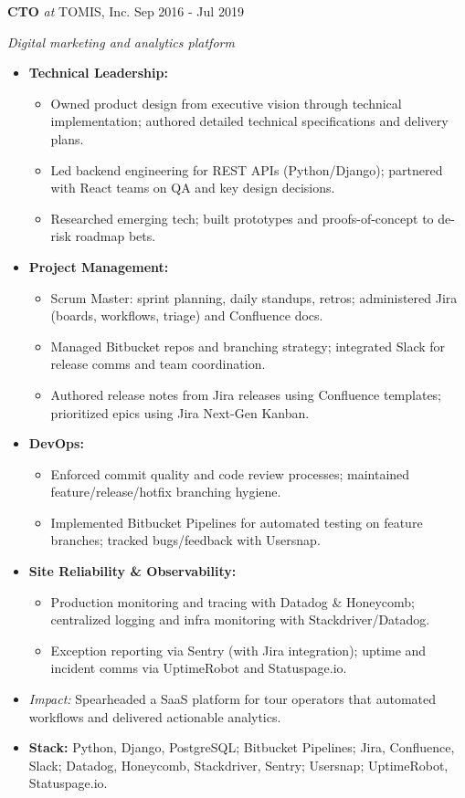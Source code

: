 \documentclass[10pt]{article}
\newcommand{\roleline}[4]{%
  \noindent\textbf{#1} \textit{at} #2 #3 \hfill #4\par
}
\begin{document}
\roleline{CTO}{TOMIS, Inc.}{}{Sep 2016 - Jul 2019}
\emph{Digital marketing and analytics platform}\par
\begin{itemize}
  \item \textbf{Technical Leadership:}
    \begin{itemize}[leftmargin=*,label=--]
      \item Owned product design from executive vision through technical implementation; authored detailed technical specifications and delivery plans.
      \item Led backend engineering for REST APIs (Python/Django); partnered with React teams on QA and key design decisions.
      \item Researched emerging tech; built prototypes and proofs-of-concept to de-risk roadmap bets.
    \end{itemize}
  \item \textbf{Project Management:}
    \begin{itemize}[leftmargin=*,label=--]
      \item Scrum Master: sprint planning, daily standups, retros; administered Jira (boards, workflows, triage) and Confluence docs.
      \item Managed Bitbucket repos and branching strategy; integrated Slack for release comms and team coordination.
      \item Authored release notes from Jira releases using Confluence templates; prioritized epics using Jira Next-Gen Kanban.
    \end{itemize}
  \item \textbf{DevOps:}
    \begin{itemize}[leftmargin=*,label=--]
      \item Enforced commit quality and code review processes; maintained feature/release/hotfix branching hygiene.
      \item Implemented Bitbucket Pipelines for automated testing on feature branches; tracked bugs/feedback with Usersnap.
    \end{itemize}
  \item \textbf{Site Reliability \& Observability:}
    \begin{itemize}[leftmargin=*,label=--]
      \item Production monitoring and tracing with Datadog \& Honeycomb; centralized logging and infra monitoring with Stackdriver/Datadog.
      \item Exception reporting via Sentry (with Jira integration); uptime and incident comms via UptimeRobot and Statuspage.io.
    \end{itemize}
  \item \textit{Impact:} Spearheaded a SaaS platform for tour operators that automated workflows and delivered actionable analytics.
  \item \textbf{Stack:} Python, Django, PostgreSQL; Bitbucket Pipelines; Jira, Confluence, Slack; Datadog, Honeycomb, Stackdriver, Sentry; Usersnap; UptimeRobot, Statuspage.io.
\end{itemize}
\end{document}

